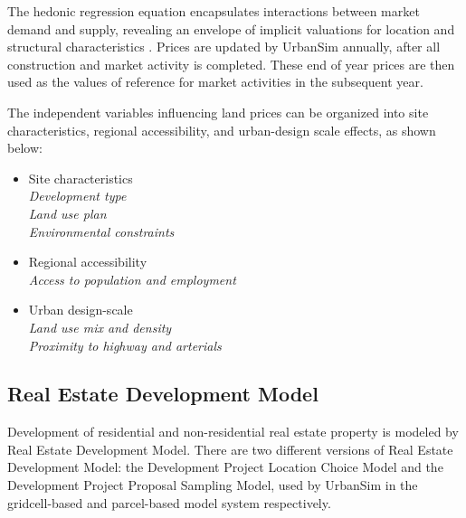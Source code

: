 The hedonic regression equation encapsulates interactions between
market demand and supply, revealing an envelope of implicit
valuations for location and structural characteristics \cite{dipasquale-wheaton-1996}.
Prices are updated by UrbanSim annually, after all construction and market
activity is completed.  These end of year prices are then used as
the values of reference for market activities in the subsequent
year.

The independent variables influencing land prices can be organized
into site characteristics, regional accessibility, and urban-design
scale effects, as shown below:

\begin{itemize}

\item Site characteristics \\
\emph{Development type \\
Land use plan \\
Environmental constraints}

\item Regional accessibility \\
\emph{Access to population and employment}

\item Urban design-scale \\
\emph{Land use mix and density \\
Proximity to highway and arterials}

\end{itemize}

\subsection{Real Estate Development Model}
\label{real-estate-development-model}


Development of residential and non-residential real estate
property is modeled by Real Estate Development Model.  There
are two different versions of Real Estate Development Model:
the Development Project Location Choice Model and the
Development Project Proposal Sampling Model, used by
UrbanSim in the gridcell-based and parcel-based model system
respectively.

